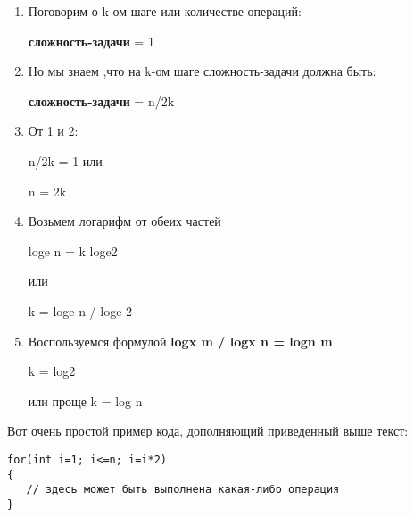 \begin{enumerate}
    \item Поговорим о k-ом шаге или количестве операций:
    
    \vspace{\baselineskip}
    \textbf{сложность-задачи} = 1
    
    \item Но мы знаем ,что на k-ом шаге сложность-задачи должна быть:
    
    \vspace{\baselineskip}
    \textbf{сложность-задачи} = n/2k
    
    \item От 1 и 2:
    
    \vspace{\baselineskip}
    n/2k = 1 или
    
    \vspace{\baselineskip}
    n = 2k
    
    \item Возьмем логарифм от обеих частей
    
    \vspace{\baselineskip}
    loge n = k loge2
    
    \vspace{\baselineskip}
    или
    
    \vspace{\baselineskip}
    k = loge n / loge 2
    
    \item Воспользуемся формулой \textbf{logx m / logx n = logn m}
    
    \vspace{\baselineskip}
    k = log2
    
    \vspace{\baselineskip}
    или проще  k = log n
\end{enumerate}

\vspace{\baselineskip}

\vspace{\baselineskip}
Вот очень простой пример кода, дополняющий приведенный выше текст:

\vspace{\baselineskip}
\begin{tcolorbox}
\begin{verbatim}
for(int i=1; i<=n; i=i*2)
{
   // здесь может быть выполнена какая-либо операция
}
\end{verbatim}
\end{tcolorbox}

